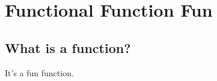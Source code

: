 \chapter{Functional Function Fun}
\label{chap:Functions}

\section{What is a function?}
It's a fun function.

